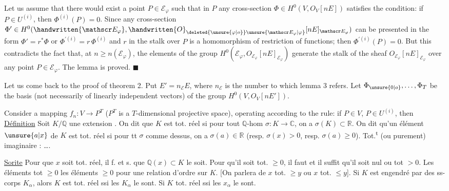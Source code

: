 Let us assume that there would exist a point $P\in\mathscr E_{\varphi}$
such that in $P$ any cross-section $\Phi\in H^0(V,O_V[nE])$
satisfies the condition: if $P\in U^{(i)}$, then $\Phi^{(i)}(P)=0$.
Since any cross-section $\Phi'\in H^0(\handwritten{\mathscr E_{\varphi}},\handwritten{O}_{\deleted{\unsure{\varphi|o}}\unsure{\mathscr E_{\varphi}|\varphi}}[nE]_{\mathscr E_{\varphi}})$ can be
presented in the form $\Phi'=r^*\Phi$ or $\Phi^{\prime(i)}=r\,\Phi^{(i)}$ and
$r$ in the stalk over $P$ is a homomorphism of restriction
of functions; then $\Phi^{\prime(i)}(P)=0$. But this contradicts
the fact that, at $n\ge n(\mathscr E_{\varphi})$, the elements of the group
$H^0(\mathscr E_{\varphi},O_{\mathscr E_{\varphi}}[nE]_{\mathscr E_{\varphi}})$ generate the stalk of the sheaf
$O_{\mathscr E_{\varphi}}[nE]_{\mathscr E_{\varphi}}$ over any point $P\in\mathscr E_{\varphi}$. The lemma is proved. $\blacksquare$

Let us come back to the proof of theorem 2. Put
$E'=n_{\mathscr E}E$, where $n_{\mathscr E}$ is the number to which lemma 3
refers. Let $\Phi_{\unsure{0|o}},\ldots,\Phi_T$ be the basis (not necessarily
of linearly independent vectors) of the group
$H^0(V,O_V[nE'])$.

Consider a mapping $f_n\colon V\to P^T$ ($P^T$ is a
$T$-dimensional projective space), operating according to
the rule: if $P\in V$, $P\in U^{(i)}$, then
\uline{Définition} Soit $K/\mathbb Q$ une extension  . On dit
que $K$ est tot. réel si pour tout $\mathbb Q$-hom $\sigma:K\to\mathbb C$,
on a $\sigma(K)\subset\mathbb R$. On dit qu'un élément $\unsure{a|x}$ de $K$ est
tot. réel  si pour tt $\sigma$ comme dessus, on a
$\sigma(a)\in\mathbb R$ (resp. $\sigma(x)>0$, resp. $\sigma(a)\ge0$). Tot.\textsuperscript{t} (ou purement)
imaginaire : \ldots .

\uline{Sorite} Pour que $x$ soit tot. réel, il f. et s. que
$\mathbb Q(x)\subset K$ le soit. Pour qu'il soit tot. $\ge0$, il faut et
il suffit qu'il soit nul ou tot $>0$. Les éléments
tot $\ge0$   les éléments $\ge0$ pour une relation
d'ordre sur $K$. [On parlera de $x$ tot. $\ge y$ ou
$x$ tot. $\le y$]. Si $K$ est engendré par des ss-corps
$K_\alpha$, alors $K$ est tot. réel ssi les $K_\alpha$ le sont. Si
$K$ tot. réel ssi  les $x_\alpha$ le sont.

